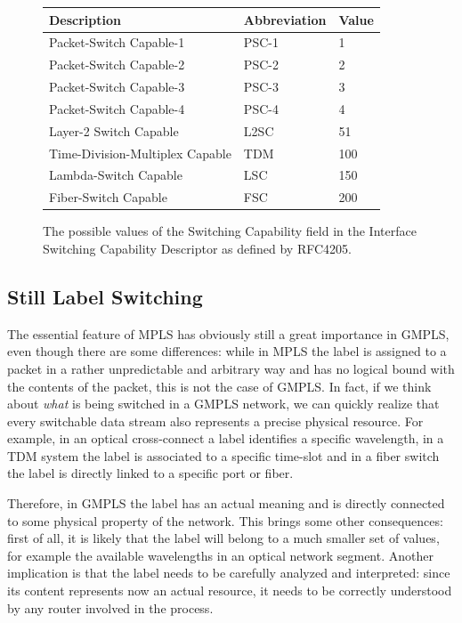 \documentclass[10pt,a4paper]{report}
\begin{document}
\begin{figure}[!hbp]
  \begin{center}
    \begin{tabular}{|l|l|l|}
      \hline
      Description & Abbreviation & Value \\ \hline
      Packet-Switch Capable-1 & PSC-1 & 1 \\
      Packet-Switch Capable-2 & PSC-2 & 2 \\
      Packet-Switch Capable-3 & PSC-3 & 3 \\
      Packet-Switch Capable-4 & PSC-4 & 4 \\
      Layer-2 Switch Capable & L2SC & 51 \\
      Time-Division-Multiplex Capable & TDM & 100 \\
      Lambda-Switch Capable & LSC & 150 \\
      Fiber-Switch Capable & FSC & 200 \\
      \hline
    \end{tabular}
    \caption[Interface Switching Capability Descriptor]{The possible
      values of the Switching Capability field in the Interface
      Switching Capability Descriptor as defined by RFC4205.}
    \label{fig:gmpls_iscd}
  \end{center}
\end{figure}

\subsection{Still Label Switching}
The essential feature of MPLS has obviously still a great importance
in GMPLS, even though there are some differences: while in MPLS the
label is assigned to a packet in a rather unpredictable and arbitrary
way and has no logical bound with the contents of the packet, this is
not the case of GMPLS\@. In fact, if we think about \textit{what} is
being switched in a GMPLS network, we can quickly realize that every
switchable data stream also represents a precise physical
resource. For example, in an optical cross-connect a label identifies
a specific wavelength, in a TDM system the label is associated to a
specific time-slot and in a fiber switch the label is directly linked
to a specific port or fiber.

Therefore, in GMPLS the label has an actual meaning and is directly
connected to some physical property of the network. This brings some
other consequences: first of all, it is likely that the label will
belong to a much smaller set of values, for example the available
wavelengths in an optical network segment. Another implication is that
the label needs to be carefully analyzed and interpreted: since its
content represents now an actual resource, it needs to be correctly
understood by any router involved in the process.
\end{document}
